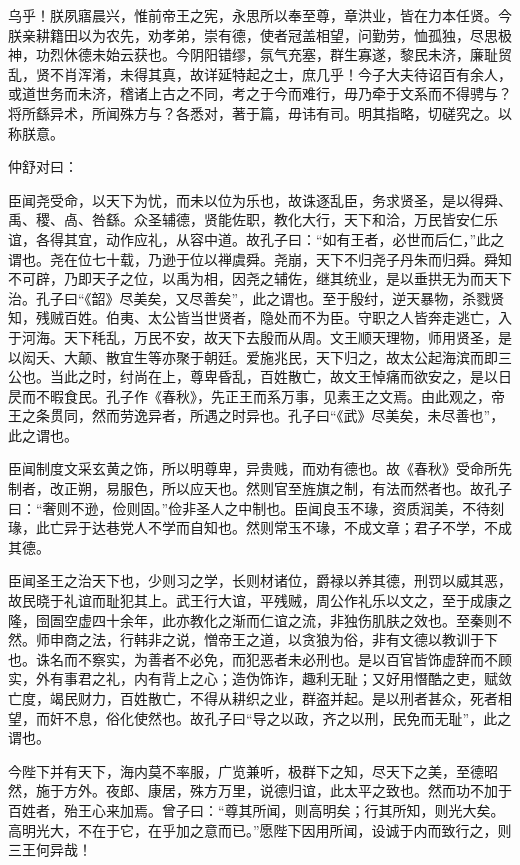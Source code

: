 \documentclass[]{article}
\begin{document}
乌乎！朕夙寤晨兴，惟前帝王之宪，永思所以奉至尊，章洪业，皆在力本任贤。今朕亲耕籍田以为农先，劝孝弟，崇有德，使者冠盖相望，问勤劳，恤孤独，尽思极神，功烈休德未始云获也。今阴阳错缪，氛气充塞，群生寡遂，黎民未济，廉耻贸乱，贤不肖浑淆，未得其真，故详延特起之士，庶几乎！今子大夫待诏百有余人，或道世务而未济，稽诸上古之不同，考之于今而难行，毋乃牵于文系而不得骋与？将所繇异术，所闻殊方与？各悉对，著于篇，毋讳有司。明其指略，切磋究之。以称朕意。

仲舒对曰：

臣闻尧受命，以天下为忧，而未以位为乐也，故诛逐乱臣，务求贤圣，是以得舜、禹、稷、卨、咎繇。众圣辅德，贤能佐职，教化大行，天下和洽，万民皆安仁乐谊，各得其宜，动作应礼，从容中道。故孔子曰：``如有王者，必世而后仁，''此之谓也。尧在位七十载，乃逊于位以禅虞舜。尧崩，天下不归尧子丹朱而归舜。舜知不可辟，乃即天子之位，以禹为相，因尧之辅佐，继其统业，是以垂拱无为而天下治。孔子曰``《韶》尽美矣，又尽善矣''，此之谓也。至于殷纣，逆天暴物，杀戮贤知，残贼百姓。伯夷、太公皆当世贤者，隐处而不为臣。守职之人皆奔走逃亡，入于河海。天下秏乱，万民不安，故天下去殷而从周。文王顺天理物，师用贤圣，是以闳夭、大颠、散宜生等亦聚于朝廷。爱施兆民，天下归之，故太公起海滨而即三公也。当此之时，纣尚在上，尊卑昏乱，百姓散亡，故文王悼痛而欲安之，是以日昃而不暇食民。孔子作《春秋》，先正王而系万事，见素王之文焉。由此观之，帝王之条贯同，然而劳逸异者，所遇之时异也。孔子曰``《武》尽美矣，未尽善也''，此之谓也。

臣闻制度文采玄黄之饰，所以明尊卑，异贵贱，而劝有德也。故《春秋》受命所先制者，改正朔，易服色，所以应天也。然则官至旌旗之制，有法而然者也。故孔子曰：``奢则不逊，俭则固。''俭非圣人之中制也。臣闻良玉不瑑，资质润美，不待刻瑑，此亡异于达巷党人不学而自知也。然则常玉不瑑，不成文章；君子不学，不成其德。

臣闻圣王之治天下也，少则习之学，长则材诸位，爵禄以养其德，刑罚以威其恶，故民晓于礼谊而耻犯其上。武王行大谊，平残贼，周公作礼乐以文之，至于成康之隆，囹圄空虚四十余年，此亦教化之渐而仁谊之流，非独伤肌肤之效也。至秦则不然。师申商之法，行韩非之说，憎帝王之道，以贪狼为俗，非有文德以教训于下也。诛名而不察实，为善者不必免，而犯恶者未必刑也。是以百官皆饰虚辞而不顾实，外有事君之礼，内有背上之心；造伪饰诈，趣利无耻；又好用憯酷之吏，赋敛亡度，竭民财力，百姓散亡，不得从耕织之业，群盗并起。是以刑者甚众，死者相望，而奸不息，俗化使然也。故孔子曰``导之以政，齐之以刑，民免而无耻''，此之谓也。

今陛下并有天下，海内莫不率服，广览兼听，极群下之知，尽天下之美，至德昭然，施于方外。夜郎、康居，殊方万里，说德归谊，此太平之致也。然而功不加于百姓者，殆王心来加焉。曾子曰：``尊其所闻，则高明矣；行其所知，则光大矣。高明光大，不在于它，在乎加之意而已。''愿陛下因用所闻，设诚于内而致行之，则三王何异哉！
\end{document}
